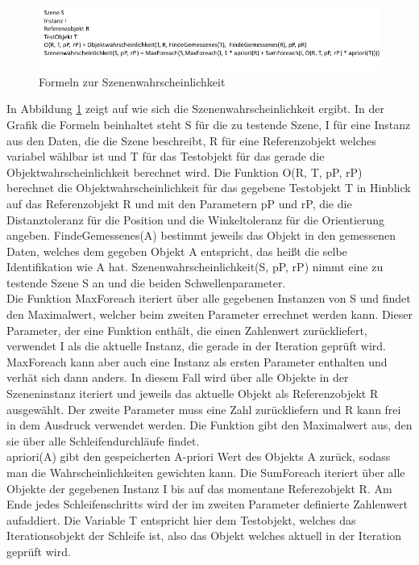 \begin{figure}
	\centering
	\includegraphics[width=16cm]{bilder/FormelnSzene.pdf}
	\caption{Formeln zur Szenenwahrscheinlichkeit}
	\label{img:formelnSzene}
\end{figure}
In Abbildung \ref{img:formelnSzene} zeigt auf wie sich die Szenenwahrscheinlichkeit ergibt. In der Grafik die Formeln beinhaltet steht S für die zu testende Szene, I für eine Instanz aus den Daten, die die Szene beschreibt, R für eine Referenzobjekt welches variabel wählbar ist und T für das Testobjekt für das gerade die Objektwahrscheinlichkeit berechnet wird. Die Funktion O(R, T, pP, rP) berechnet die Objektwahrscheinlichkeit für das gegebene Testobjekt T in Hinblick auf das Referenzobjekt R und mit den Parametern pP und rP, die die Distanztoleranz für die Position und die Winkeltoleranz für die Orientierung angeben. FindeGemessenes(A) bestimmt jeweils das Objekt in den gemessenen Daten, welches dem gegeben Objekt A entspricht, das heißt die selbe Identifikation wie A hat. Szenenwahrscheinlichkeit(S, pP, rP) nimmt eine zu testende Szene S an und die beiden Schwellenparameter.\smallskip\\
Die Funktion MaxForeach iteriert über alle gegebenen Instanzen von S und findet den Maximalwert, welcher beim zweiten Parameter errechnet werden kann. Dieser Parameter, der eine Funktion enthält, die einen Zahlenwert zurückliefert, verwendet I als die aktuelle Instanz, die gerade in der Iteration geprüft wird. MaxForeach kann aber auch eine Instanz als ersten Parameter enthalten und verhät sich dann anders. In diesem Fall wird über alle Objekte in der Szeneninstanz iteriert und jeweils das aktuelle Objekt als Referenzobjekt R ausgewählt. Der zweite Parameter muss eine Zahl zurückliefern und R kann frei in dem Ausdruck verwendet werden. Die Funktion gibt den Maximalwert aus, den sie über alle Schleifendurchläufe findet.\smallskip\\
apriori(A) gibt den gespeicherten A-priori Wert des Objekts A zurück, sodass man die Wahrscheinlichkeiten gewichten kann. Die SumForeach iteriert über alle Objekte der gegebenen Instanz I bis auf das momentane Referezobjekt R. Am Ende jedes Schleifenschritts wird der im zweiten Parameter definierte Zahlenwert aufaddiert. Die Variable T entspricht hier dem Testobjekt, welches das Iterationsobjekt der Schleife ist, also das Objekt welches aktuell in der Iteration geprüft wird.\smallskip\\
